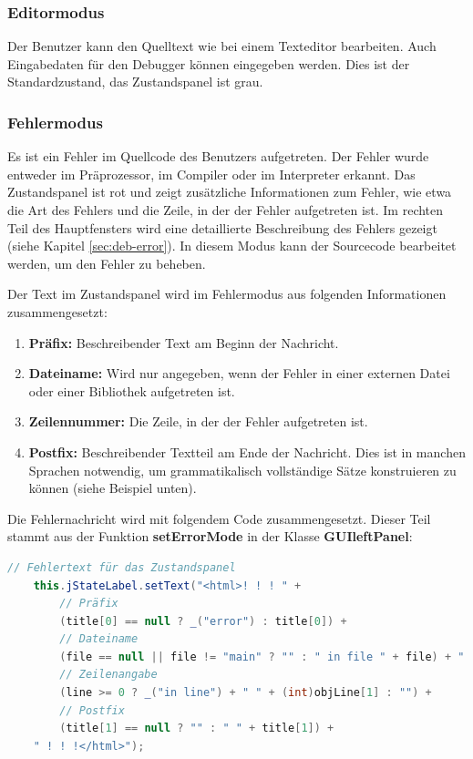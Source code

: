 \subsubsection*{Editormodus}
Der Benutzer kann den Quelltext wie bei einem Texteditor bearbeiten. Auch Eingabedaten für den Debugger können eingegeben werden. Dies ist der Standardzustand, das Zustandspanel ist grau.
\subsubsection*{Fehlermodus} Es ist ein Fehler im Quellcode des Benutzers aufgetreten. Der Fehler wurde entweder im Präprozessor, im Compiler oder im Interpreter erkannt. Das Zustandspanel ist rot und zeigt zusätzliche Informationen zum Fehler, wie etwa die Art des Fehlers und die Zeile, in der der Fehler aufgetreten ist. Im rechten Teil des Hauptfensters wird eine detaillierte Beschreibung des Fehlers gezeigt (siehe Kapitel \ref{sec:deb-error}). In diesem Modus kann der Sourcecode bearbeitet werden, um den Fehler zu beheben.

Der Text im Zustandspanel wird im Fehlermodus aus folgenden Informationen zusammengesetzt:
\begin{enumerate}
\item \textbf{Präfix:} Beschreibender Text am Beginn der Nachricht.
\item \textbf{Dateiname:} Wird nur angegeben, wenn der Fehler in einer externen Datei oder einer Bibliothek aufgetreten ist.
\item \textbf{Zeilennummer:} Die Zeile, in der der Fehler aufgetreten ist.
\item \textbf{Postfix:} Beschreibender Textteil am Ende der Nachricht. Dies ist in manchen Sprachen notwendig, um grammatikalisch vollständige Sätze konstruieren zu können (siehe Beispiel unten).
\end{enumerate}

Die Fehlernachricht wird mit folgendem Code zusammengesetzt. Dieser Teil stammt aus der Funktion \textbf{setErrorMode} in der Klasse \textbf{GUIleftPanel}:

\begin{lstlisting}[language=JAVA]
	// Fehlertext für das Zustandspanel
	this.jStateLabel.setText("<html>! ! ! " +
		// Präfix
		(title[0] == null ? _("error") : title[0]) +
		// Dateiname
		(file == null || file != "main" ? "" : " in file " + file) + " " +
		// Zeilenangabe
		(line >= 0 ? _("in line") + " " + (int)objLine[1] : "") +
		// Postfix
		(title[1] == null ? "" : " " + title[1]) +
	" ! ! !</html>");
\end{lstlisting}

